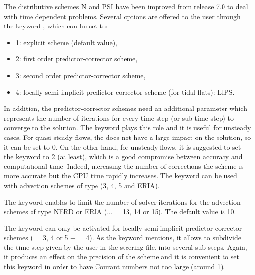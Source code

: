 The distributive schemes N and PSI have been improved from release 7.0 to deal
with time dependent problems. Several options are offered to the user through
the keyword , which can be set to:
\begin{itemize}
\item 1: explicit scheme (default value),
\item 2: first order predictor-corrector scheme,
\item 3: second order predictor-corrector scheme,
\item 4: locally semi-implicit predictor-corrector scheme
(for tidal flats): LIPS.
\end{itemize}
In addition, the predictor-corrector schemes need an additional parameter
which represents the number of iterations for every time step (or sub-time step)
to converge to the solution.
The keyword 
plays this role and it is useful for unsteady cases.
For quasi-steady flows, the
does not have a large impact on the solution, so it can be set to 0.
On the other hand, for unsteady flows, it is suggested to set the keyword
 to 2 (at least),
which is a good compromise between accuracy and computational time.
Indeed, increasing the number of corrections the scheme is more accurate
but the CPU time rapidly increases.
The keyword  can be used
with advection schemes of type (3, 4, 5 and ERIA).

The keyword 
enables to limit the number of solver iterations for the advection schemes
of type NERD or ERIA (... = 13, 14 or 15).
The default value is 10.

The keyword 
can only be activated for locally semi-implicit predictor-corrector schemes
( = 3, 4 or 5
+  = 4).
As the keyword mentions, it allows to subdivide the time step given by the user
in the steering file, into several sub-steps.
Again, it produces an effect on the precision of the scheme
and it is convenient to set this keyword in order to have Courant numbers
not too large (around 1).

